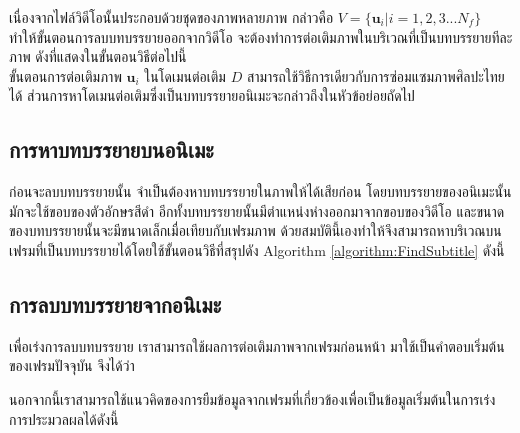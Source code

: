 \hspace{1cm}เนื่องจากไฟล์วิดีโอนั้นประกอบด้วยชุดของภาพหลายภาพ กล่าวคือ $V = \{\boldsymbol{u}_i| i = 1,2,3 ... N_f\}$ ทำให้ขั้นตอนการลบบทบรรยายออกจากวิดีโอ จะต้องทำการต่อเติมภาพในบริเวณที่เป็นบทบรรยายทีละภาพ \break ดังที่แสดงในขั้นตอนวิธีต่อไปนี้ \\
	


\vspace{1cm}
\hspace{1cm} ขั้นตอนการต่อเติมภาพ $\boldsymbol{u}_i$ ในโดเมนต่อเติม $D$ สามารถใช้วิธีการเดียวกับการซ่อมแซมภาพศิลปะไทยได้ ส่วนการหาโดเมนต่อเติมซึ่งเป็นบทบรรยายอนิเมะจะกล่าวถึงในหัวข้อย่อยถัดไป

\subsection{การหาบทบรรยายบนอนิเมะ}	
\hspace{1cm}ก่อนจะลบบทบรรยายนั้น จำเป็นต้องหาบทบรรยายในภาพให้ได้เสียก่อน โดยบทบรรยายของอนิเมะนั้น มักจะใช้ขอบของตัวอักษรสีดำ อีกทั้งบทบรรยายนั้นมีตำแหน่งห่างออกมาจากขอบของวิดีโอ และขนาดของบทบรรยายนั้นจะมีขนาดเล็กเมื่อเทียบกับเฟรมภาพ ด้วยสมบัตินี้เองทำให้จึงสามารถหาบริเวณบนเฟรมที่เป็นบทบรรยายได้โดยใช้ขั้นตอนวิธีที่สรุปดัง Algorithm \ref{algorithm:FindSubtitle} ดังนี้
	
\vspace{1cm}



\subsection{การลบบทบรรยายจากอนิเมะ}

\hspace{1cm} เพื่อเร่งการลบบทบรรยาย เราสามารถใช้ผลการต่อเติมภาพจากเฟรมก่อนหน้า มาใช้เป็นคำตอบเริ่มต้นของเฟรมปัจจุบัน จึงได้ว่า\\
	
\vspace{0.5cm}

\vspace{0.5cm}



\vspace{0.5cm}	
\hspace{1cm} นอกจากนี้เราสามารถใช้แนวคิดของการยืมข้อมูลจากเฟรมที่เกี่ยวข้องเพื่อเป็นข้อมูลเริ่มต้นในการเร่งการประมวลผลได้ดังนี้ \\
	
\vspace{0.5cm}

 
\vspace{0.5cm}

\vspace{0.5cm}

\vspace{0.5cm}


